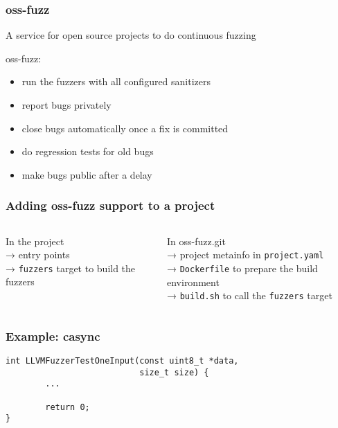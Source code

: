 \documentclass[serif]{beamer}
\begin{document}
\begin{frame}
  \frametitle{oss-fuzz}

  A service for open source projects to do continuous fuzzing

  \bigskip

  \pause
  oss-fuzz:
  \begin{itemize}
  \item run the fuzzers with all configured sanitizers
  \item report bugs privately
  \item close bugs automatically once a fix is committed
  \item do regression tests for old bugs
  \item make bugs public after a delay
  \end{itemize}
\end{frame}

\begin{frame}
  \frametitle{Adding oss-fuzz support to a project}

  \begin{columns}
    \begin{column}[t]{0.5\textwidth}
      In the project\\
      → entry points\\
      → \texttt{fuzzers} target to build the fuzzers
    \end{column}
    \begin{column}[t]{0.5\textwidth}
      In oss-fuzz.git\\
      → project metainfo in \texttt{project.yaml}\\
      → \texttt{Dockerfile} to prepare the build environment\\
      → \texttt{build.sh} to call the \texttt{fuzzers} target
    \end{column}
  \end{columns}
\end{frame}

\begin{frame}[fragile]
  \frametitle{Example: casync}

  \begin{verbatim}
int LLVMFuzzerTestOneInput(const uint8_t *data,
                           size_t size) {
        ...

        return 0;
}
\end{verbatim}
\end{frame}
\end{document}
